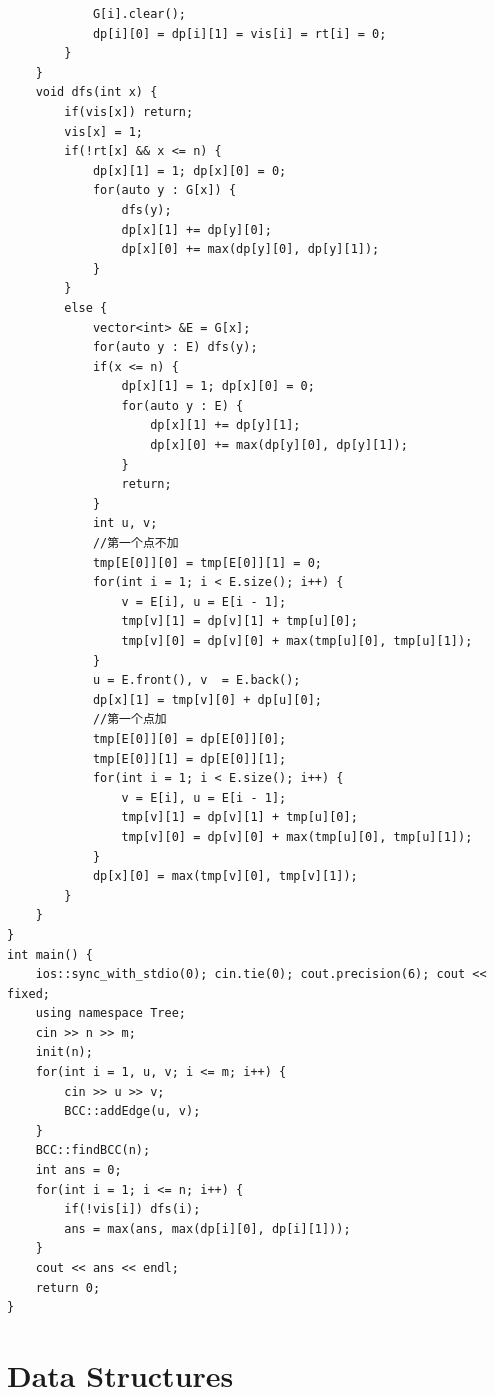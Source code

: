 \documentclass[10pt]{ctexart}
\begin{document}
{\begin{lstlisting}
            G[i].clear();
            dp[i][0] = dp[i][1] = vis[i] = rt[i] = 0;
        }
    }
    void dfs(int x) {
        if(vis[x]) return;
        vis[x] = 1;
        if(!rt[x] && x <= n) {
            dp[x][1] = 1; dp[x][0] = 0;
            for(auto y : G[x]) {
                dfs(y);
                dp[x][1] += dp[y][0];
                dp[x][0] += max(dp[y][0], dp[y][1]);
            }
        }
        else {
            vector<int> &E = G[x];
            for(auto y : E) dfs(y);
            if(x <= n) {
                dp[x][1] = 1; dp[x][0] = 0;
                for(auto y : E) {
                    dp[x][1] += dp[y][1];
                    dp[x][0] += max(dp[y][0], dp[y][1]);
                }
                return;
            }
            int u, v;
            //第一个点不加
            tmp[E[0]][0] = tmp[E[0]][1] = 0;
            for(int i = 1; i < E.size(); i++) {
                v = E[i], u = E[i - 1];
                tmp[v][1] = dp[v][1] + tmp[u][0];
                tmp[v][0] = dp[v][0] + max(tmp[u][0], tmp[u][1]);
            }
            u = E.front(), v  = E.back();
            dp[x][1] = tmp[v][0] + dp[u][0];
            //第一个点加
            tmp[E[0]][0] = dp[E[0]][0];
            tmp[E[0]][1] = dp[E[0]][1];
            for(int i = 1; i < E.size(); i++) {
                v = E[i], u = E[i - 1];
                tmp[v][1] = dp[v][1] + tmp[u][0];
                tmp[v][0] = dp[v][0] + max(tmp[u][0], tmp[u][1]);
            }
            dp[x][0] = max(tmp[v][0], tmp[v][1]);
        }
    }
}
int main() {
    ios::sync_with_stdio(0); cin.tie(0); cout.precision(6); cout << fixed;
    using namespace Tree;
    cin >> n >> m;
    init(n);
    for(int i = 1, u, v; i <= m; i++) {
        cin >> u >> v;
        BCC::addEdge(u, v);
    }
    BCC::findBCC(n);
    int ans = 0;
    for(int i = 1; i <= n; i++) {
        if(!vis[i]) dfs(i);
        ans = max(ans, max(dp[i][0], dp[i][1]));
    }
    cout << ans << endl;
    return 0;
}
\end{lstlisting}

\newpage
\section{Data Structures}
}
\end{document}

